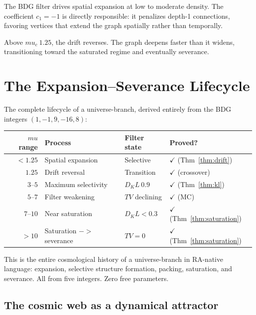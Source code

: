 \documentclass[11pt]{article}
\def\mu{mu}%
\def\mathrm#1{#1}%
\def\approx{~}%
\def\to{->}%
\def\Dkl{D_KL}%
\def\TV{TV}%
\newcommand{\Dkl}{D_{\mathrm{KL}}}
\newcommand{\TV}{\mathrm{TV}}
\begin{document}
The BDG filter drives spatial expansion at low to moderate density. The coefficient $c_1=-1$ is directly responsible: it penalizes depth-1 connections, favoring vertices that extend the graph spatially rather than temporally.

Above $\mu_c\approx 1.25$, the drift reverses. The graph deepens faster than it widens, transitioning toward the saturated regime and eventually severance.

\section{The Expansion--Severance Lifecycle}
\label{sec:lifecycle}

The complete lifecycle of a universe-branch, derived entirely from the BDG integers $(1,-1,9,-16,8)$:

\begin{center}
\begin{tabular}{rlll}
\toprule
$\mu$ range & Process & Filter state & Proved? \\
\midrule
$<1.25$ & Spatial expansion & Selective & $\checkmark$ (Thm~\ref{thm:drift}) \\
$\approx 1.25$ & Drift reversal & Transition & $\checkmark$ (crossover) \\
$3$--$5$ & Maximum selectivity & $\Dkl\approx 0.9$ & $\checkmark$ (Thm~\ref{thm:kl}) \\
$5$--$7$ & Filter weakening & $\TV$ declining & $\checkmark$ (MC) \\
$7$--$10$ & Near saturation & $\Dkl<0.3$ & $\checkmark$ (Thm~\ref{thm:saturation}) \\
$>10$ & Saturation $\to$ severance & $\TV=0$ & $\checkmark$ (Thm~\ref{thm:saturation}) \\
\bottomrule
\end{tabular}
\end{center}

This is the entire cosmological history of a universe-branch in RA-native language: expansion, selective structure formation, packing, saturation, and severance. All from five integers. Zero free parameters.

\subsection{The cosmic web as a dynamical attractor}
\label{sec:cosmic_web}
\end{document}
